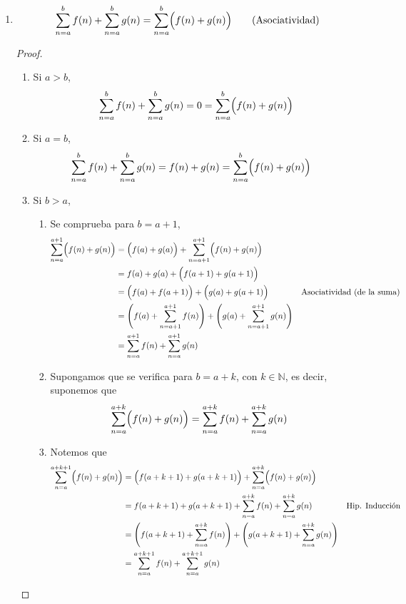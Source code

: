 \documentclass[11pt]{article}
\newcommand{\N}{\mathbb{N}}
\begin{document}
\begin{enumerate}[label=\alph*)]
  \item \[\sum_{n=a}^{b} f(n) + \sum_{n=a}^{b} g(n) = \sum_{n=a}^{b} \Bigl(f(n) + g(n)\Bigr) \qquad \text{(Asociatividad)}\]
  \begin{proof}\leavevmode
    \begin{enumerate}[label=\Roman*)]
      \item Si $a>b$,
      \begin{align*}
        \sum_{n=a}^{b} f(n) + \sum_{n=a}^{b} g(n) = 0 = \sum_{n=a}^{b} \Bigl(f(n) + g(n)\Bigr)
      \end{align*}
      \item Si $a=b$,
      \begin{align*}
        \sum_{n=a}^{b} f(n) + \sum_{n=a}^{b} g(n) &= f(n) + g(n) = \sum_{n=a}^{b} \Bigl(f(n) + g(n)\Bigr)
      \end{align*}
      \item Si $b>a$,
      \begin{enumerate}[label=\roman*)]
        \item Se comprueba para $b=a+1$,
        \begin{align*}
          \sum_{n=a}^{a+1} \Bigl(f(n) + g(n)\Bigr) &= \Bigl(f(a) + g(a)\Bigr) + \sum_{n=a+1}^{a+1} \Bigl(f(n) + g(n)\Bigr)\\
          &= f(a) + g(a) + \Bigl(f(a+1) + g(a+1)\Bigr)\\
          &= \Bigl(f(a) + f(a+1)\Bigr) + \Bigl(g(a) + g(a+1)\Bigr) && \text{Asociatividad (de la suma)}\\
          &= \Biggl(f(a) + \sum_{n=a+1}^{a+1} f(n)\Biggr) + \Biggl(g(a) + \sum_{n=a+1}^{a+1} g(n)\Biggr)\\
          &= \sum_{n=a}^{a+1} f(n) + \sum_{n=a}^{a+1} g(n)
        \end{align*}
        \item Supongamos que se verifica para $b=a+k$, con $k\in \N$, es decir, suponemos que
        \begin{align*}
          \sum_{n=a}^{a+k} \Bigl(f(n) + g(n)\Bigr) &= \sum_{n=a}^{a+k} f(n) + \sum_{n=a}^{a+k} g(n)
        \end{align*}
        \item Notemos que
        \begin{align*}
          \sum_{n=a}^{a+k+1} \Bigl(f(n) + g(n)\Bigr) &= \Bigl(f(a+k+1) + g(a+k+1)\Bigr) + \sum_{n=a}^{a+k} \Bigl(f(n) + g(n)\Bigr)\\
          &= f(a+k+1) + g(a+k+1) + \sum_{n=a}^{a+k} f(n) + \sum_{n=a}^{a+k} g(n) && \text{Hip. Inducción}\\
          &= \Biggl(f(a+k+1) + \sum_{n=a}^{a+k} f(n)\Biggr) + \Biggl(g(a+k+1) + \sum_{n=a}^{a+k} g(n)\Biggr)\\
          &= \sum_{n=a}^{a+k+1} f(n) + \sum_{n=a}^{a+k+1} g(n)
        \end{align*}
      \end{enumerate}
    \end{enumerate}
  \end{proof}
  

\end{enumerate}
\end{document}
